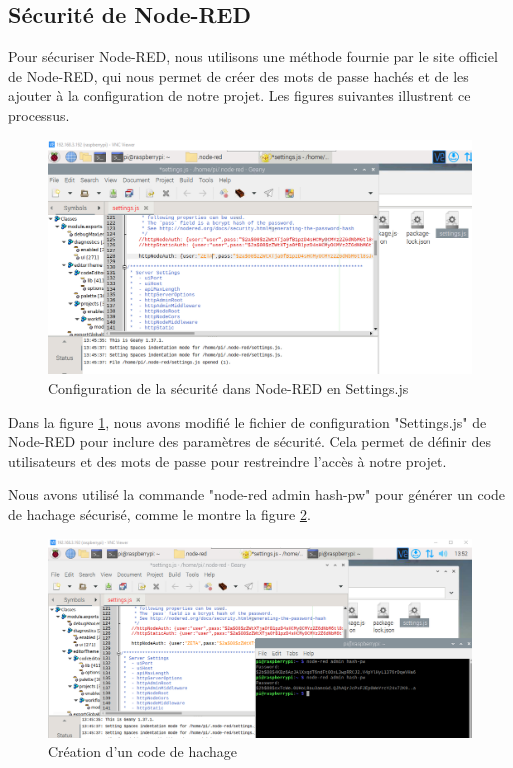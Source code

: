 \subsection{Sécurité de Node-RED}

Pour sécuriser Node-RED, nous utilisons une méthode fournie par le site officiel de Node-RED, qui nous permet de créer des mots de passe hachés et de les ajouter à la configuration de notre projet. Les figures suivantes illustrent ce processus.

\begin{figure}[H]
\centering
\includegraphics[width=14cm]{Images/Node-2.png}
\caption{Configuration de la sécurité dans Node-RED en Settings.js}
\label{Chap4.3.9}
\end{figure}

Dans la figure \ref{Chap4.3.9}, nous avons modifié le fichier de configuration "Settings.js" de Node-RED pour inclure des paramètres de sécurité. Cela permet de définir des utilisateurs et des mots de passe pour restreindre l'accès à notre projet.

Nous avons utilisé la commande "node-red admin hash-pw" pour générer un code de hachage sécurisé, comme le montre la figure \ref{Chap4.3.10}.

\begin{figure}[H]
\centering
\includegraphics[width=15cm]{Images/Node-3.png}
\caption{Création d'un code de hachage}
\label{Chap4.3.10}
\end{figure}

